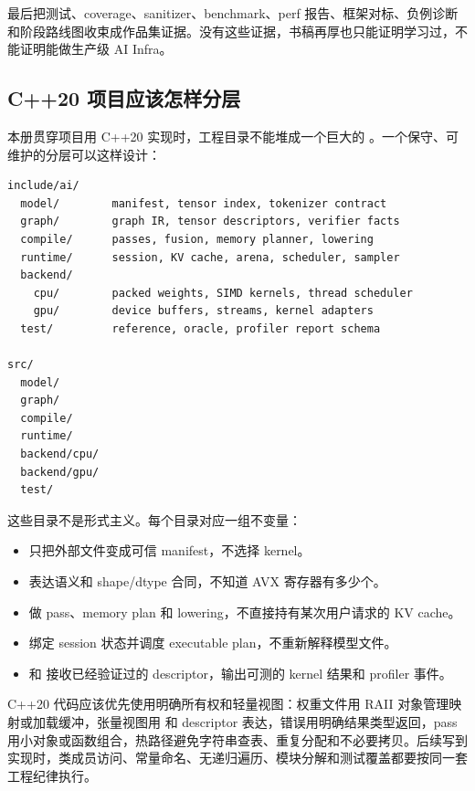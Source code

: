  最后把测试、coverage、sanitizer、benchmark、perf 报告、框架对标、负例诊断和阶段路线图收束成作品集证据。没有这些证据，书稿再厚也只能证明学习过，不能证明能做生产级 AI Infra。

\subsection{C++20 项目应该怎样分层}

本册贯穿项目用 C++20 实现时，工程目录不能堆成一个巨大的 。一个保守、可维护的分层可以这样设计：

\begin{lstlisting}[numbers=none,caption={C++20 AI inference infra 的建议模块边界}]
include/ai/
  model/        manifest, tensor index, tokenizer contract
  graph/        graph IR, tensor descriptors, verifier facts
  compile/      passes, fusion, memory planner, lowering
  runtime/      session, KV cache, arena, scheduler, sampler
  backend/
    cpu/        packed weights, SIMD kernels, thread scheduler
    gpu/        device buffers, streams, kernel adapters
  test/         reference, oracle, profiler report schema

src/
  model/
  graph/
  compile/
  runtime/
  backend/cpu/
  backend/gpu/
  test/
\end{lstlisting}

这些目录不是形式主义。每个目录对应一组不变量：

\begin{itemize}
  \item {} 只把外部文件变成可信 manifest，不选择 kernel。
  \item {} 表达语义和 shape/dtype 合同，不知道 AVX 寄存器有多少个。
  \item {} 做 pass、memory plan 和 lowering，不直接持有某次用户请求的 KV cache。
  \item {} 绑定 session 状态并调度 executable plan，不重新解释模型文件。
  \item {} 和  接收已经验证过的 descriptor，输出可测的 kernel 结果和 profiler 事件。
\end{itemize}

C++20 代码应该优先使用明确所有权和轻量视图：权重文件用 RAII 对象管理映射或加载缓冲，张量视图用  和 descriptor 表达，错误用明确结果类型返回，pass 用小对象或函数组合，热路径避免字符串查表、重复分配和不必要拷贝。后续写到实现时，类成员访问、常量命名、无递归遍历、模块分解和测试覆盖都要按同一套工程纪律执行。

